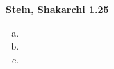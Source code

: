 \textbf{Stein, Shakarchi 1.25}

\begin{enumerate}[(a)]
    \item 
    \item 
    \item 
\end{enumerate}